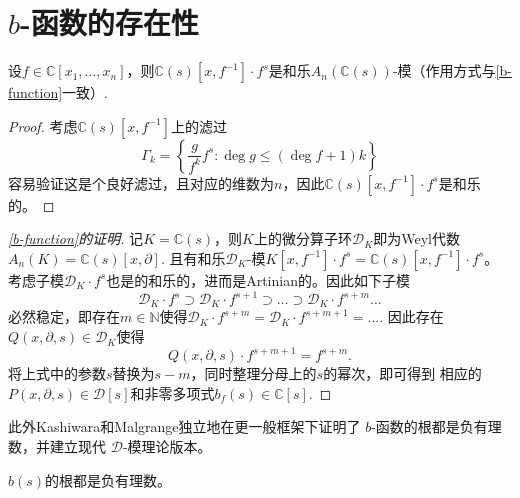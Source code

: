 \documentclass[12pt,a4paper]{ctexrep}   %
\begin{document}
\section{$b$-函数的存在性}

\begin{proposition}
    设$f\in \mathbb{C}[x_1,\ldots,x_n]$，则$\mathbb{C}(s)[x,f^{-1}]\cdot f^s$是和乐$A_n(\mathbb{C}(s))$-模（作用方式与\ref{b-function}一致）.
    \begin{proof}
        考虑$\mathbb{C}(s)[x,f^{-1}]$上的滤过
        \begin{equation*}
            \Gamma_k=\left\{\frac{g}{f^k}f^s:\deg g \leq (\deg f +1)k\right\}
        \end{equation*}
        容易验证这是个良好滤过，且对应的维数为$n$，因此$\mathbb{C}(s)[x,f^{-1}]\cdot f^s$是和乐的。
    \end{proof}
\end{proposition}


\begin{proof}[\ref{b-function}的证明]
    记$K=\mathbb{C}(s)$，则$K$上的微分算子环$\mathcal{D}_K$即为Weyl代数$A_n(K)=\mathbb{C}(s)[x,\partial]$.
    且有和乐$\mathcal{D}_K$-模$K[x,f^{-1}]\cdot f^s=\mathbb{C}(s)[x,f^{-1}]\cdot f^s$。考虑子模$\mathcal{D}_K\cdot f^s$也是的和乐的，进而是Artinian的。因此如下子模
    \begin{equation*}
        \mathcal{D}_K\cdot f^s\supset \mathcal{D}_K\cdot f^{s+1}\supset \ldots \supset \mathcal{D}_K\cdot f^{s+m} \ldots
    \end{equation*}
    必然稳定，即存在$m\in \mathbb{N}$使得$\mathcal{D}_K\cdot f^{s+m}=\mathcal{D}_K\cdot f^{s+m+1}=\ldots $.
    因此存在$Q(x,\partial,s)\in \mathcal{D}_K$使得
    \begin{equation*}
        Q(x,\partial,s)\cdot f^{s+m+1}=f^{s+m}.
    \end{equation*}
    将上式中的参数$s$替换为$s-m$，同时整理分母上的$s$的幂次，即可得到
    相应的$P(x,\partial,s)\in \mathcal{D}[s]$和非零多项式$b_f(s)\in \mathbb{C}[s]$.
\end{proof}


此外Kashiwara和Malgrange独立地在更一般框架下证明了 $b$-函数的根都是负有理数，并建立现代 $\mathcal
    {D}$-模理论版本。
\begin{theorem}
    $b(s)$的根都是负有理数。
\end{theorem}
\end{document}
